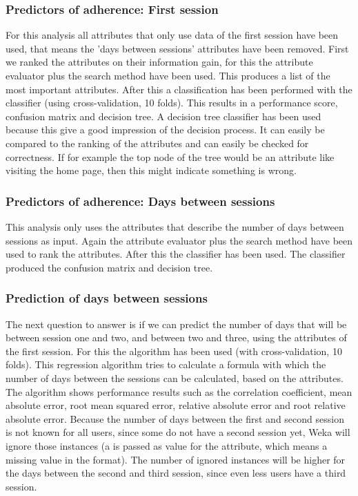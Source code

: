 \subsubsection{Predictors of adherence: First session}
For this analysis all attributes that only use data of the first session have been used, that means the 'days between sessions' attributes have been removed. First we ranked the attributes on their information gain, for this the  attribute evaluator plus the  search method have been used. This produces a list of the most important attributes. After this a classification has been performed with the  classifier (using cross-validation, 10 folds). This results in a performance score, confusion matrix and decision tree. A decision tree classifier has been used because this give a good impression of the decision process. It can easily be compared to the ranking of the attributes and can easily be checked for correctness. If for example the top node of the tree would be an attribute like visiting the home page, then this might indicate something is wrong.

\subsubsection{Predictors of adherence: Days between sessions}
This analysis only uses the attributes that describe the number of days between sessions as input. Again the  attribute evaluator plus the  search method have been used to rank the attributes. After this the  classifier has been used. The classifier produced the confusion matrix and decision tree.

\subsubsection{Prediction of days between sessions}
The next question to answer is if we can predict the number of days that will be between session one and two, and between two and three, using the attributes of the first session. For this the  algorithm has been used (with cross-validation, 10 folds). This regression algorithm tries to calculate a formula with which the number of days between the sessions can be calculated, based on the attributes. The algorithm shows performance results such as the correlation coefficient, mean absolute error, root mean squared error, relative absolute error and root relative absolute error. Because the number of days between the first and second session is not known for all users, since some do not have a second session yet, Weka will ignore those instances (a  is passed as value for the attribute, which means a missing value in the  format). The number of ignored instances will be higher for the days between the second and third session, since even less users have a third session.










